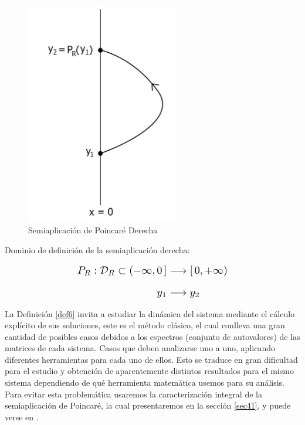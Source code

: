 \documentclass[12pt,a4paper]{report} %
\begin{document}
	\begin{figure}[h]
		\centering
		\includegraphics[width=0.6\textwidth]{semiR.jpg}
		\caption{Semiaplicación de Poincaré Derecha}
		\label{fig:semiR}
	\end{figure}\smallskip
	
	\vspace{0.5cm}Dominio de definición de la semiaplicación derecha:
	
	\vspace{0.5cm}
	
	\begin{equation}
		\label{eq:dr}
		\scalebox{1.3}{$\displaystyle
			\begin{aligned}
				P_R:\mathcal{D}_R\subset (-\infty,0\,] &\longrightarrow [\,0, +\infty)\\[2mm]
				y_1 &\longrightarrow y_2
			\end{aligned}
			$}
	\end{equation}
	
	\vspace{0.5cm} La Definición \ref{def6} invita a estudiar la dinámica del sistema mediante el cálculo explícito de sus soluciones, este es el método clásico, el cual conlleva una gran cantidad de posibles casos debidos a los espectros (conjunto de autovalores) de las matrices de cada sistema. Casos que deben analizarse uno a uno, aplicando diferentes herramientas para cada uno de ellos. Esto se traduce en gran dificultad para el estudio y obtención de aparentemente distintos resultados para el mismo sistema dependiendo de qué herramienta matemática usemos para su análisis. Para evitar esta problemática usaremos la caracterización integral de la semiaplicación de Poincaré, la cual presentaremos en la sección \ref{sec41}, y puede verse en \cite{caracterizacion}.
	\newpage
	
\end{document}
